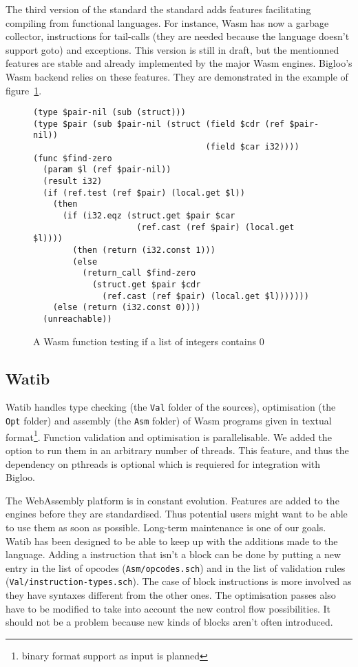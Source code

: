 \documentclass[10pt]{article}
\begin{document}
The third version of the standard the standard adds features facilitating
compiling from functional languages. For instance, Wasm has now a garbage
collector, instructions for tail-calls (they are needed because the language
doesn't support goto) and exceptions. This version is still in draft, but the
mentionned features are stable and already implemented by the major Wasm
engines. Bigloo's Wasm backend relies on these features. They are demonstrated
in the example of figure~\ref{ex}.

\begin{figure}[h]
  \begin{minipage}{\widthof{(type \$pair (sub \$pair-nil (struct (field \$cdr (ref \$pair-nil))}}
\begin{verbatim}
(type $pair-nil (sub (struct)))
(type $pair (sub $pair-nil (struct (field $cdr (ref $pair-nil))
                                   (field $car i32))))
(func $find-zero
  (param $l (ref $pair-nil))
  (result i32)
  (if (ref.test (ref $pair) (local.get $l))
    (then
      (if (i32.eqz (struct.get $pair $car
                     (ref.cast (ref $pair) (local.get $l))))
        (then (return (i32.const 1)))
        (else
          (return_call $find-zero
            (struct.get $pair $cdr
              (ref.cast (ref $pair) (local.get $l)))))))
    (else (return (i32.const 0))))
  (unreachable))
\end{verbatim}
  \end{minipage}

  \caption{A Wasm function testing if a list of integers contains 0}\label{ex}
\end{figure}

\subsection{Watib}
\textsf{Watib} handles type checking (the \texttt{Val} folder of the sources),
optimisation (the \texttt{Opt} folder) and assembly (the \texttt{Asm} folder) of
Wasm programs given in textual format\footnote{binary format support as input is
planned}. Function validation and optimisation is parallelisable. We added the
option to run them in an arbitrary number of threads. This feature, and thus the
dependency on pthreads is optional which is requiered for integration with
Bigloo.

The WebAssembly platform is in constant evolution. Features are added to the
engines before they are standardised. Thus potential users might want to be able
to use them as soon as possible. Long-term maintenance is one of our goals.
\textsf{Watib} has been designed to be able to keep up with the additions made
to the language. Adding a instruction that isn't a block can be done by putting
a new entry in the list of opcodes (\texttt{Asm/opcodes.sch}) and in the list of
validation rules (\texttt{Val/instruction-types.sch}). The case of block
instructions is more involved as they have syntaxes different from the other
ones. The optimisation passes also have to be modified to take into account the
new control flow possibilities. It should not be a problem because new kinds of
blocks aren't often introduced.
\end{document}
